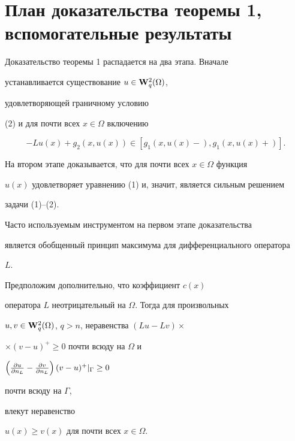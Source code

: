  


\section{План доказательства теоремы 1, вспомогательные результаты} 


 


Доказательство теоремы 1 распадается на два этапа. Вначале 


устанавливается существование $u\in\bold W^2_q(\Omega)$, 


удовлетворяющей граничному условию 


(2) и для почти всех $x\in\Omega$ включению 


\begin{equation} 


-Lu(x)+g_2(x,u(x))\in[g_1(x,u(x)-),g_1(x,u(x)+)]. 


\end{equation} 


На втором этапе доказывается, что для почти всех $x\in\Omega$ функция 


$u(x)$ удовлетворяет уравнению (1) и, значит, является сильным решением 


задачи (1)--(2). 


 


Часто используемым инструментом на первом этапе доказательства 


является обобщенный принцип максимума для дифференциального оператора 


$L$. 


 


\begin{thm}[{\myfont{}[15]}] 


Предположим дополнительно, что коэффициент $c(x)$ 


оператора $L$ не\-отрицательный на $\Omega$. Тогда для произвольных 


$u,v\in\bold W^2_q(\Omega)$, $q>n$, неравенства $(Lu-Lv)\times$




$\times(v-u)^+\ge 0$ почти всюду на $\Omega$ и 


$\left(\frac{\partial u}{\partial n_L}-\frac{\partial v}{\partial n_L}\right)(v-u)^+|_\Gamma\ge 0$ 


почти всюду на $\Gamma$, 


влекут неравенство 


$u(x)\ge v(x)$ для почти всех $x\in\Omega$. 


\end{thm} 


